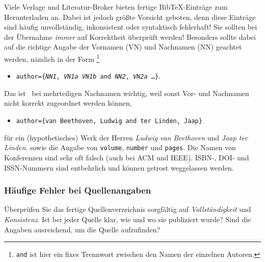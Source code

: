 Viele Verlage und Literatur-Broker bieten fertige BibTeX-Einträge zum Herunterladen an.
Dabei ist jedoch größte Vorsicht geboten, denn diese Einträge sind häufig
unvollständig, inkonsistent oder syntaktisch fehlerhaft!
Sie sollten bei der Übernahme \emph{immer} auf Korrektheit überprüft werden!
Besonders sollte dabei auf die richtige Angabe der Vornamen (VN) und Nachnamen (NN) geachtet werden,
nämlich in der Form%
\footnote{\texttt{and} ist hier ein fixes Trennwort zwischen den Namen der einzelnen Autoren.}
\begin{itemize}
\item[]
\texttt{author=\{\textit{NN1}, \textit{VN1a} \emph{VN1b} and \textit{NN2}, \textit{VN2a} \ldots \}}.
\end{itemize}
Das ist \va\ bei mehrteiligen Nachnamen wichtig, weil sonst
Vor- und Nachnamen nicht korrekt zugeordnet werden können, \zB
\begin{itemize}
\item[]
\texttt{author=\{van Beethoven, Ludwig and ter Linden, Jaap\}}
\end{itemize}
für ein (hypothetisches) Werk der Herren \emph{Ludwig van Beethoven} und \emph{Jaap ter Linden}.
sowie die Angabe von \texttt{volume}, \texttt{number} und \texttt{pages}.
Die Namen von Konferenzen sind sehr oft falsch (auch bei ACM und IEEE).
ISBN-, DOI- und ISSN-Nummern sind entbehrlich und können getrost weggelassen werden.


\subsubsection{Häufige Fehler bei Quellenangaben}

Überprüfen Sie das fertige Quellenverzeichnis sorgfältig auf \emph{Vollständigkeit} und \emph{Konsistenz}. 
Ist bei jeder Quelle klar, wie und wo sie publiziert wurde? 
Sind die Angaben ausreichend, um die Quelle aufzufinden?

